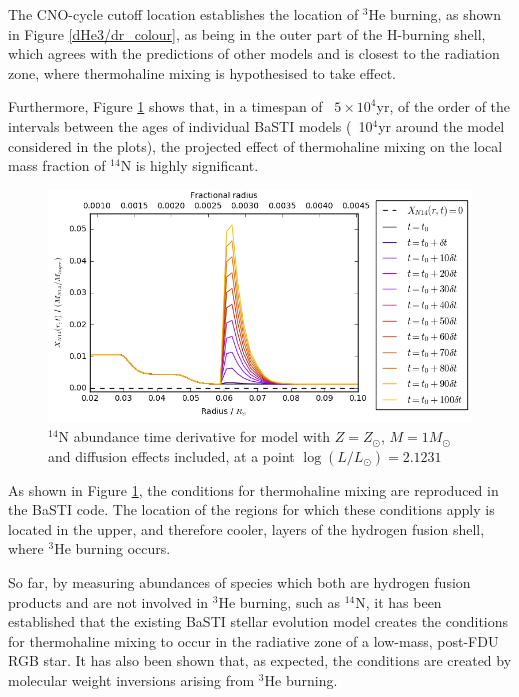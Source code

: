 \documentclass[12pt, a4paper]{report}
\begin{document}
The CNO-cycle cutoff location establishes the location of $^{3}$He burning, as shown in Figure \ref{dHe3/dr_colour}, as being in the outer part of the H-burning shell, which agrees with the predictions of other models and is closest to the radiation zone, where thermohaline mixing is hypothesised to take effect.

Furthermore, Figure \ref{dXN14/dt_colour} shows that, in a timespan of ~$5 \times 10^{4}$yr, of the order of the intervals between the ages of individual BaSTI models (~10$^{4}$yr around the model considered in the plots), the projected effect of thermohaline mixing on the local mass fraction of $^{14}$N is highly significant.

\begin{figure}
\begin{center}
\includegraphics[scale=0.7]{../mu_test_data/mu_test_graphs/eq_logL=2p1231_time_diff_eq_Dvar_10dt_dmu_k_lim_crop.png}
\caption{$^{14}$N abundance time derivative for model with $Z = Z_{\odot}$, $M = 1M_{\odot}$ and diffusion effects included, at a point $\log(L/L_{\odot}) = 2.1231$}
\label{dXN14/dt_colour}
\end{center}
\end{figure}

As shown in Figure \ref{dXN14/dt_colour}, the conditions for thermohaline mixing are reproduced in the BaSTI code. The location of the regions for which these conditions apply is located in the upper, and therefore cooler, layers of the hydrogen fusion shell, where $^{3}$He burning occurs.

So far, by measuring abundances of species which both are hydrogen fusion products and are not involved in $^{3}$He burning, such as $^{14}$N, it has been established that the existing BaSTI stellar evolution model creates the conditions for thermohaline mixing to occur in the radiative zone of a low-mass, post-FDU RGB star. It has also been shown that, as expected, the conditions are created by molecular weight inversions arising from $^{3}$He burning.
\end{document}
